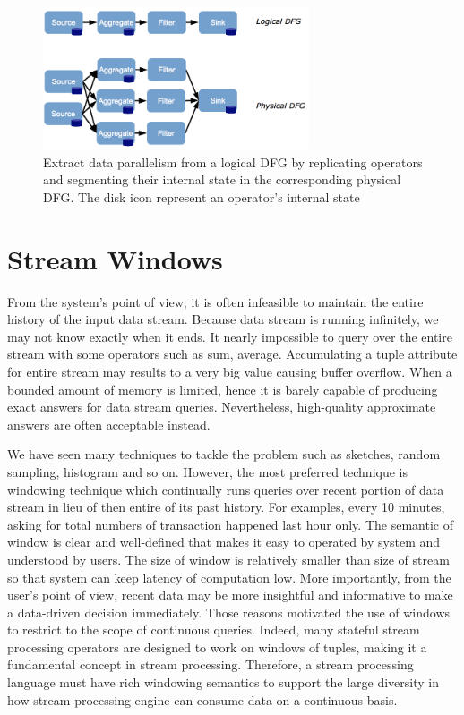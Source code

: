 \begin{figure}[htbp!] 
\centering    
\includegraphics[width=0.7\textwidth]{logicalPhysicalDataFlow}
\caption[Minion]{Extract data parallelism from a logical DFG by replicating operators and segmenting their internal state in the corresponding physical DFG. The disk icon represent an operator's internal state \citep{Henrique:2013}}
\label{fig:streamRepresent}
\end{figure}

   
    
    
\section{Stream Windows}

From the system's point of view, it is often infeasible to maintain the entire history of the input data stream. Because data stream is running infinitely, we may not know exactly when it ends. It nearly impossible to query over the entire stream with some operators such as sum, average. Accumulating a tuple attribute for entire stream may results to a very big value causing  buffer overflow.  When a bounded amount of memory is limited, hence it is barely capable of producing exact answers for data stream queries. Nevertheless, high-quality approximate answers are often acceptable instead. 

We have seen many techniques to tackle the problem such as sketches, random sampling, histogram and so on. However, the most preferred technique is windowing technique which continually runs queries over recent portion of data stream  in lieu of then entire of its past history. For examples, every 10 minutes, asking for total numbers of transaction happened last hour only. The semantic of window is clear and well-defined that makes it easy to operated by system and understood by users. The size of window is relatively smaller than size of stream so that system can keep latency of computation low.  More importantly, from the user's point of view, recent data may be more insightful and informative to make a data-driven decision immediately. Those reasons motivated the use of windows to restrict to the scope of continuous queries. Indeed, many stateful stream processing operators are designed to work on windows of tuples, making it a fundamental concept in stream processing. Therefore, a stream processing language must have rich windowing semantics to support the large diversity in how stream processing engine can consume data on a continuous basis.


